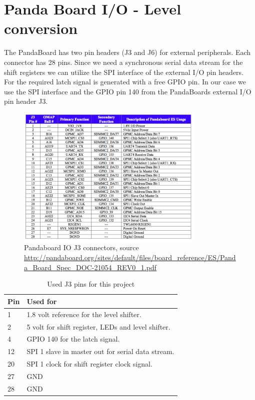\section{Panda Board I/O - Level conversion}
The PandaBoard has two pin headers (J3 and J6) for external peripherals. Each connector has 28 pins.
Since we need a synchronous serial data stream for the shift registers we can utilize the SPI interface of the external I/O pin headers. For the required latch signal is generated with a free GPIO pin. 
In our case we use the SPI interface and the GPIO pin 140 from the PandaBoards external I/O pin header J3.


\begin{figure}[H]
   \centering
   \includegraphics[width=0.8\textwidth]{img/PandaBoard_IO_J3.png}%
   \caption{Pandaboard IO J3 connectors,  source  \url{http://pandaboard.org/sites/default/files/board_reference/ES/Panda_Board_Spec_DOC-21054_REV0_1.pdf}}
   \label{fig:pandaBoardIOJ3}%
\end{figure}


\begin{table}[H]
\centering
\begin{tabular}{| l |  p{7cm} |}
\hline
\textbf{Pin} & \textbf{Used for} \\ \hline
1 & 1.8 volt reference for the level shifter. \\ \hline
2 & 5 volt for shift register, LEDs and level shifter. \\ \hline
4 & GPIO 140 for the latch signal. \\ \hline
12 & SPI 1 slave in master out  for serial data stream. \\ \hline
20 & SPI 1 clock for shift register clock signal. \\ \hline
27 & GND \\ \hline
28 & GND \\
\hline
\end{tabular}
\caption{Used J3 pins for this project}
\label{tab:pinUsageTable}
\end{table}

